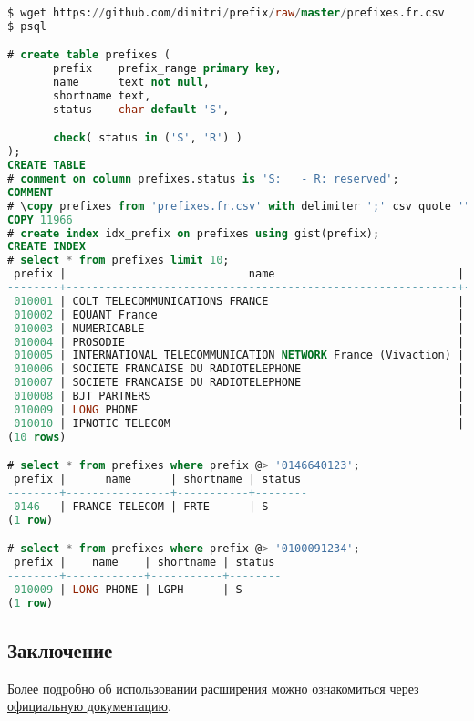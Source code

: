 \begin{lstlisting}[language=SQL,label=lst:pgprefixexample2,caption=Проверка prefix]
$ wget https://github.com/dimitri/prefix/raw/master/prefixes.fr.csv
$ psql

# create table prefixes (
       prefix    prefix_range primary key,
       name      text not null,
       shortname text,
       status    char default 'S',

       check( status in ('S', 'R') )
);
CREATE TABLE
# comment on column prefixes.status is 'S:   - R: reserved';
COMMENT
# \copy prefixes from 'prefixes.fr.csv' with delimiter ';' csv quote '"'
COPY 11966
# create index idx_prefix on prefixes using gist(prefix);
CREATE INDEX
# select * from prefixes limit 10;
 prefix |                            name                            | shortname | status
--------+------------------------------------------------------------+-----------+--------
 010001 | COLT TELECOMMUNICATIONS FRANCE                             | COLT      | S
 010002 | EQUANT France                                              | EQFR      | S
 010003 | NUMERICABLE                                                | NURC      | S
 010004 | PROSODIE                                                   | PROS      | S
 010005 | INTERNATIONAL TELECOMMUNICATION NETWORK France (Vivaction) | ITNF      | S
 010006 | SOCIETE FRANCAISE DU RADIOTELEPHONE                        | SFR       | S
 010007 | SOCIETE FRANCAISE DU RADIOTELEPHONE                        | SFR       | S
 010008 | BJT PARTNERS                                               | BJTP      | S
 010009 | LONG PHONE                                                 | LGPH      | S
 010010 | IPNOTIC TELECOM                                            | TLNW      | S
(10 rows)

# select * from prefixes where prefix @> '0146640123';
 prefix |      name      | shortname | status
--------+----------------+-----------+--------
 0146   | FRANCE TELECOM | FRTE      | S
(1 row)

# select * from prefixes where prefix @> '0100091234';
 prefix |    name    | shortname | status
--------+------------+-----------+--------
 010009 | LONG PHONE | LGPH      | S
(1 row)
\end{lstlisting}


\subsection{Заключение}

Более подробно об использовании расширения можно ознакомиться через \href{https://github.com/dimitri/prefix/blob/master/README.md}{официальную документацию}.
